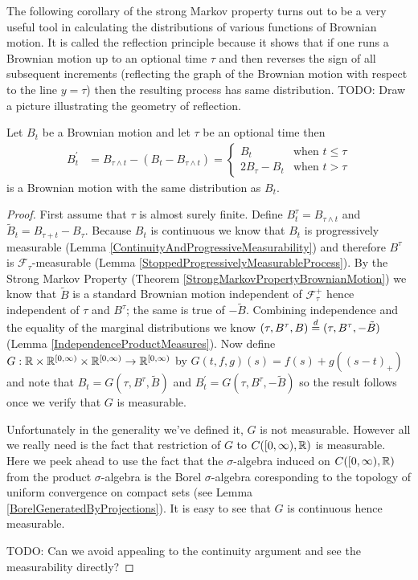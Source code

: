 The following corollary of the strong Markov property turns out to be
a very useful tool in calculating the distributions of various
functions of Brownian motion.  It is called the reflection principle
because it shows that if one runs a Brownian motion up to an optional
time $\tau$ and then reverses the sign of all subsequent increments
(reflecting the graph of the Brownian motion with respect to the line
$y=\tau$) then the resulting process has same distribution.  TODO: Draw a picture illustrating the
geometry of reflection.
\begin{lem}\label{ReflectionPrinciple}Let $B_t$ be a Brownian motion and let $\tau$ be an
  optional time then 
\begin{align*}
B^\prime_t &= B_{\tau \wedge t} - (B_t - B_{\tau \wedge t}) = \begin{cases}
B_t & \text{when $t \leq \tau$} \\
2 B_\tau - B_t & \text{when $t > \tau$}
\end{cases}
\end{align*}
is a Brownian motion with the same distribution as $B_t$.
\end{lem}
\begin{proof}
First assume that $\tau$ is almost surely finite.  Define $B^\tau_t =
B_{\tau \wedge t}$ and $\tilde{B}_t = B_{\tau + t} - B_{\tau}$.  Because
$B_t$ is continuous we know that $B_t$ is progressively measurable
(Lemma \ref{ContinuityAndProgressiveMeasurability}) and therefore $B^\tau$ is
$\mathcal{F}_\tau$-measurable (Lemma \ref{StoppedProgressivelyMeasurableProcess}).  By the Strong Markov Property (Theorem
\ref{StrongMarkovPropertyBrownianMotion}) we know that $\tilde{B}$ is a standard Brownian
motion independent of $\mathcal{F}^+_\tau$ hence independent of $\tau$
and $B^\tau$; the same is true of $-\tilde{B}$.  Combining independence and
the equality of the marginal distributions we know $(\tau, B^\tau,
B) \overset{d}= (\tau, B^\tau, -\tilde{B})$ (Lemma
\ref{IndependenceProductMeasures}).  Now define $G : \mathbb{R} \times
\mathbb{R}^{[0,\infty)} \times \mathbb{R}^{[0,\infty)} \to
\mathbb{R}^{[0,\infty)}$ by $G(t,f,g)(s) = f(s) + g((s-t)_+)$ and note
that $B_t = G(\tau, B^\tau, \tilde{B})$ and $B^\prime_t = G(\tau, B^\tau,
-\tilde{B})$ so the result follows once we verify that $G$ is measurable.

Unfortunately in the generality we've defined it, $G$ is not
measurable.  However all we really need is the fact that restriction
of $G$ to $C([0,\infty), \mathbb{R})$ is measurable.  Here we peek ahead
to use the fact that the $\sigma$-algebra induced on $C([0,\infty),
\mathbb{R})$ from the product $\sigma$-algebra is the Borel
$\sigma$-algebra coresponding to the topology of uniform convergence
on compact sets (see Lemma \ref{BorelGeneratedByProjections}).  It is
easy to see that $G$ is continuous hence measurable.

TODO: Can we avoid appealing to the continuity argument and see the
measurability directly?
\end{proof}

